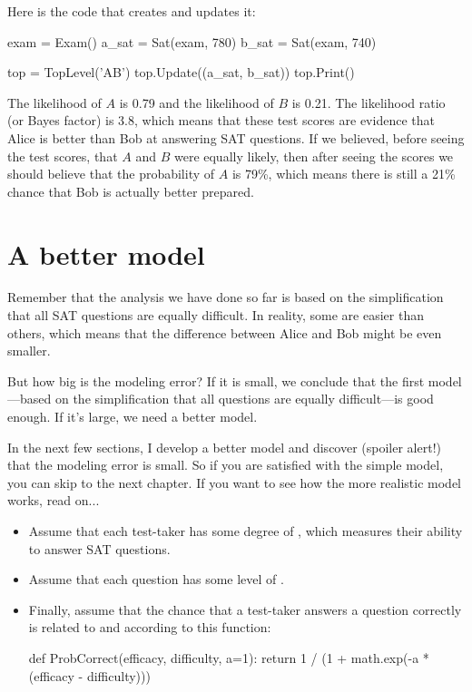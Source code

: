 \documentclass[12pt]{book}
\theoremstyle{exercise}
\begin{document}
Here is the code that creates  and updates it:

\begin{code}
    exam = Exam()
    a_sat = Sat(exam, 780)
    b_sat = Sat(exam, 740)

    top = TopLevel('AB')
    top.Update((a_sat, b_sat))
    top.Print()
\end{code}

The likelihood of $A$ is 0.79 and the likelihood of $B$ is 0.21.  The
likelihood ratio (or Bayes factor) is 3.8, which means that these test
scores are evidence that Alice is better than Bob at answering SAT
questions.  If we believed, before seeing the test scores, that $A$
and $B$ were equally likely, then after seeing the scores we should
believe that the probability of $A$ is 79\%, which means there is
still a 21\% chance that Bob is actually better prepared.


\section{A better model}

Remember that the analysis we have done so far is based on
the simplification that all SAT questions are equally difficult.
In reality, some are easier than others, which means that the
difference between Alice and Bob might be even smaller.

But how big is the modeling error?  If it is small, we conclude
that the first model---based on the simplification that all questions
are equally difficult---is good enough.  If it's large,
we need a better model.

In the next few sections, I develop a better model and 
discover (spoiler alert!) that the modeling error is small.  So if
you are satisfied with the simple model, you can skip to the next
chapter.  If you want to see how the more realistic model works,
read on...

\begin{itemize}

\item Assume that each test-taker has some 
  degree of , which measures their
  ability to answer SAT questions.

\item Assume that each question has some level of
  .

\item Finally, assume that the chance that a test-taker answers a
  question correctly is related to  and 
  according to this function:

\begin{code}
def ProbCorrect(efficacy, difficulty, a=1):
    return 1 / (1 + math.exp(-a * (efficacy - difficulty)))
\end{code}

\end{itemize}
\end{document}
